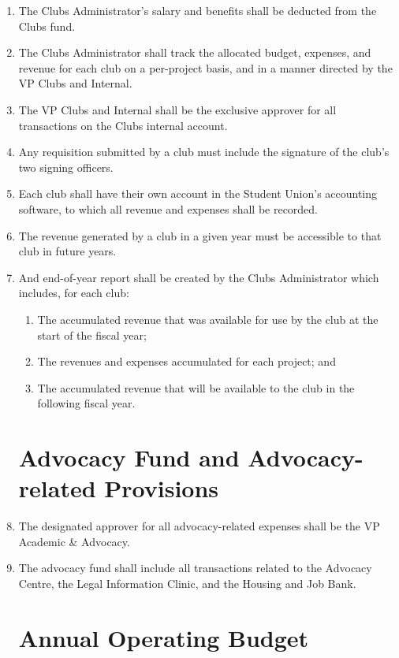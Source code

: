 \documentclass[oneside]{book}
\begin{document}
\begin{enumerate}
\item The Clubs Administrator's salary and benefits shall be deducted from the Clubs fund.
\item The Clubs Administrator shall track the allocated budget, expenses, and revenue for each club on a per-project basis, and in a manner directed by the VP Clubs and Internal.
\item The VP Clubs and Internal shall be the exclusive approver for all transactions on the Clubs internal account. 
\item Any requisition submitted by a club must include the signature of the club’s two signing officers.
\item Each club shall have their own account in the Student Union’s accounting software, to which all revenue and expenses shall be recorded.
\item The revenue generated by a club in a given year must be accessible to that club in future years.
\item And end-of-year report shall be created by the Clubs Administrator which includes, for each club:
\begin{enumerate}
\item The accumulated revenue that was available for use by the club at the start of the fiscal year;
\item The revenues and expenses accumulated for each project; and
\item The accumulated revenue that will be available to the club in the following fiscal year.
\end{enumerate}

\chapter{\label{Advocacy_Fund_and_Advocacy-related_Provisions}Advocacy Fund and Advocacy-related Provisions}

\item The designated approver for all advocacy-related expenses shall be the VP Academic \& Advocacy.
\item The advocacy fund shall include all transactions related to the Advocacy Centre, the Legal Information Clinic, and the Housing and Job Bank. 

\chapter{\label{Annual_Operating_Budget}Annual Operating Budget}


\end{enumerate}
\end{document}
